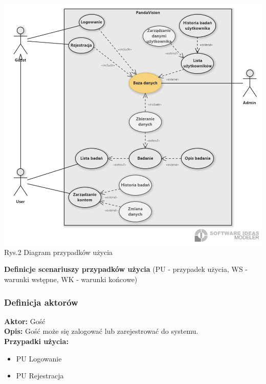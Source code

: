 \documentclass[12pt, letterpaper]{article}
\begin{document}
		\begin{center}
			\includegraphics[scale=0.5]{useCaseDiagram}\\
			\caption{Rys.2 Diagram przypadków użycia}
		\end{center}		
		
		\textbf{Definicje scenariuszy przypadków użycia} (PU - przypadek użycia, WS - warunki wstępne, WK - warunki końcowe)\\
		
		\newpage
		
		
		\subsubsection{Definicja aktorów}
		
		\quad		
		
		\textbf{Aktor:} Gość\\
		
		\textbf{Opis:} Gość może się zalogować lub zarejestrować do systemu.\\
		
		\textbf{Przypadki użycia:}
		
		\begin{itemize}
			\item PU Logowanie
			\item PU Rejestracja
		\end{itemize}
		
\end{document}
